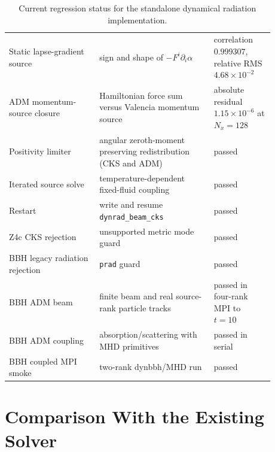 \documentclass[11pt]{article}
\newcommand{\code}[1]{\texttt{#1}}
\begin{document}
\begin{table}[htbp]
\begin{tabular}{p{0.30\linewidth}p{0.38\linewidth}p{0.20\linewidth}}
Static lapse-gradient source & sign and shape of \(-F^i\partial_i\alpha\) & correlation \(0.999307\), relative RMS \(4.68\times10^{-2}\) \\
ADM momentum-source closure & Hamiltonian force sum versus Valencia momentum source & absolute residual \(1.15\times10^{-6}\) at \(N_x=128\) \\
Positivity limiter & angular zeroth-moment preserving redistribution (CKS and ADM) & passed \\
Iterated source solve & temperature-dependent fixed-fluid coupling & passed \\
Restart & write and resume \code{dynrad\_beam\_cks} & passed \\
Z4c CKS rejection & unsupported metric mode guard & passed \\
BBH legacy radiation rejection & \code{prad} guard & passed \\
BBH ADM beam & finite beam and real source-rank particle tracks & passed in four-rank MPI to \(t=10\) \\
BBH ADM coupling & absorption/scattering with MHD primitives & passed in serial \\
BBH coupled MPI smoke & two-rank dynbbh/MHD run & passed \\
\bottomrule
\end{tabular}
\caption{Current regression status for the standalone dynamical radiation
implementation.}
\label{tab:tests}
\end{table}

\section{Comparison With the Existing Solver}
\label{sec:comparison}
\end{document}
